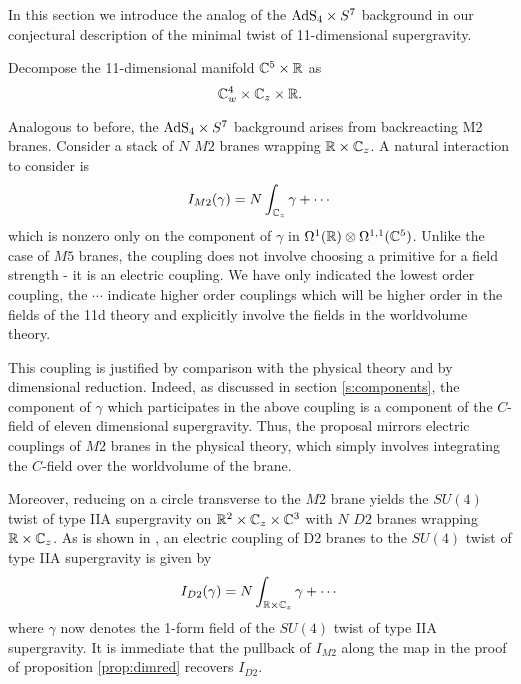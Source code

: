 In this section we introduce the analog of the ${\rm AdS}_4 \times S^7$ background in our conjectural description of the minimal twist of 11-dimensional supergravity. 

\parsec[]

Decompose the 11-dimensional manifold $\mathbb C^5 \times \mathbb R$ as
\[
 \mathbb C^4_w\times \mathbb C_z \times \mathbb R .
\]

Analogous to before, the ${\rm AdS}_4 \times S^7$ background arises from backreacting M2 branes. Consider a stack of $N$ $M2$ branes wrapping $\mathbb{R}\times \mathbb{C}_z$. A natural interaction to consider is 
\[
I_{M2}(\gamma) = N\int_{\mathbb{C}_z} \gamma + \cdots
\] 
which is nonzero only on the component of $\gamma$ in $\Omega^1(\mathbb{R})\otimes \Omega^{1,1}(\mathbb{C}^5)$. Unlike the case of $M5$ branes, the coupling does not involve choosing a primitive for a field strength - it is an electric coupling.
We have only indicated the lowest order coupling, the $\cdots$ indicate higher order couplings which will be higher order in the fields of the 11d theory and explicitly involve the fields in the worldvolume theory. 

This coupling is justified by comparison with the physical theory and by dimensional reduction. 
Indeed, as discussed in section \ref{s:components}, the component of $\gamma$ which participates in the above coupling is a component of the $C$-field of eleven dimensional supergravity. Thus, the proposal mirrors electric couplings of $M2$ branes in the physical theory, which simply involves integrating the $C$-field over the worldvolume of the brane. 

Moreover, reducing on a circle transverse to the $M2$ brane yields the $SU(4)$ twist of type IIA supergravity on $\mathbb{R}^2\times \mathbb{C}_z\times \mathbb{C}^3$ with $N$ $D2$ branes wrapping $\mathbb{R}\times \mathbb{C}_z$. As is shown in \cite{CLsugra}, an electric coupling of D2 branes to the $SU(4)$ twist of type IIA supergravity is given by 
\[
I_{D2}(\gamma) = N \int_{\mathbb{R}\times\mathbb{C}_z} \gamma + \cdots
\] 
where $\gamma$ now denotes the 1-form field of the $SU(4)$ twist of type IIA supergravity. It is immediate that the pullback of $I_{M2}$ along the map in the proof of proposition \ref{prop:dimred} recovers $I_{D2}$. 



